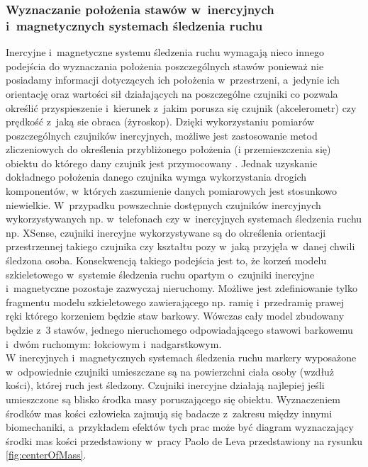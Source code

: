 \subsubsection*{Wyznaczanie położenia stawów w~inercyjnych i~magnetycznych systemach śledzenia ruchu}
Inercyjne i~magnetyczne systemu śledzenia ruchu wymagają nieco innego podejścia do wyznaczania położenia poszczególnych stawów ponieważ nie posiadamy informacji dotyczących ich położenia w~przestrzeni, a~jedynie ich orientację oraz wartości sił działających na poszczególne czujniki co pozwala określić przyspieszenie i~kierunek z~jakim porusza się czujnik (akcelerometr) czy prędkość z~jaką sie obraca (żyroskop). Dzięki wykorzystaniu pomiarów poszczególnych czujników inercyjnych, możliwe jest zastosowanie metod zliczeniowych do określenia przybliżonego położenia (i przemieszczenia się) obiektu do którego dany czujnik jest przymocowany \cite{HyeRiPark2009, Montorsi2013b}. Jednak uzyskanie dokładnego położenia danego czujnika wymga wykorzystania drogich komponentów, w~których zaszumienie danych pomiarowych jest stosunkowo niewielkie. W~przypadku powszechnie dostępnych czujników inercyjnych wykorzystywanych np. w~telefonach czy w~inercyjnych systemach śledzenia ruchu np. XSense, czujniki inercyjne wykorzystywane są do określenia orientacji przestrzennej takiego czujnika czy kształtu pozy w~jaką przyjęła w~danej chwili śledzona osoba. Konsekwencją takiego podejścia jest to, że korzeń modelu szkieletowego w~systemie śledzenia ruchu opartym o~czujniki inercyjne i~magnetyczne pozostaje zazwyczaj nieruchomy. Możliwe jest zdefiniowanie tylko fragmentu modelu szkieletowego zawierającego np. ramię i~przedramię prawej ręki którego korzeniem będzie staw barkowy. Wówczas cały model zbudowany będzie z~3 stawów, jednego nieruchomego odpowiadającego stawowi barkowemu i~dwóm ruchomym: łokciowym i~nadgarstkowym.\\
		
W inercyjnych i~magnetycznych systemach śledzenia ruchu markery wyposażone w~odpowiednie czujniki umieszczane są na powierzchni ciała osoby (wzdłuż kości), której ruch jest śledzony. Czujniki inercyjne działają najlepiej jeśli umieszczone są blisko środka masy poruszającego się obiektu. Wyznaczeniem środków mas kości człowieka zajmują się badacze z~zakresu między innymi biomechaniki, a~przykładem efektów tych prac może być diagram wyznaczający środki mas kości przedstawiony w~pracy Paolo de Leva \cite{DeLeva1996} przedstawiony na rysunku \ref{fig:centerOfMass}.\\
		
